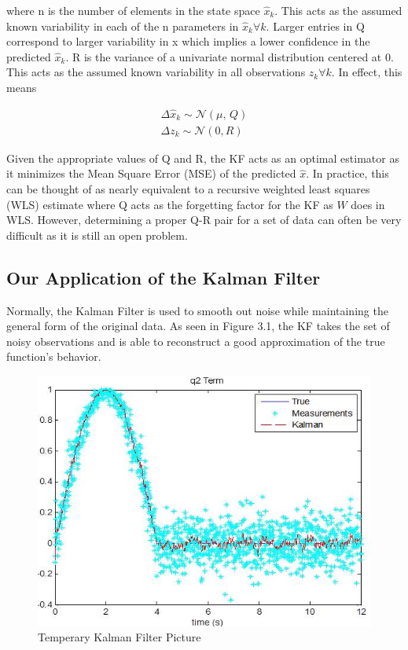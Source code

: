  where n is the number of elements in the state space $\hat{x}_{k}$. This acts as the assumed known variability in each of the n parameters in $\hat{x}_{k} \forall k$. Larger entries in Q correspond to larger variability in x which implies a lower confidence in the predicted $\hat{x}_{k}$. R is the variance of a univariate normal distribution centered at 0. This acts as the assumed known variability in all observations $z_{k} \forall k$. In effect, this means
 
\begin{subequations}
\begin{align}
    \Delta \hat{x}_{k} \sim \mathcal{N}(\mu,\,Q) \\
    \Delta z_{k} \sim \mathcal{N}(0,R) 
\end{align}
\end{subequations}

Given the appropriate values of Q and R, the KF acts as an optimal estimator as it minimizes the Mean Square Error (MSE) of the predicted $\hat{x}$. In practice, this can be thought of as nearly equivalent to a recursive weighted least squares (WLS) estimate where Q acts as the forgetting factor for the KF as $W$ does in WLS. However, determining a proper Q-R pair for a set of data can often be very difficult as it is still an open problem.

\subsection{Our Application of the Kalman Filter}
Normally, the Kalman Filter is used to smooth out noise while maintaining the general form of the original data. As seen in Figure 3.1, the KF takes the set of noisy observations and is able to reconstruct a good approximation of the true function's behavior.

\begin{figure}[h]
\centering
\includegraphics{body/methodology/q2_kalman.jpg}
\caption{Temperary Kalman Filter Picture}
\end{figure}

